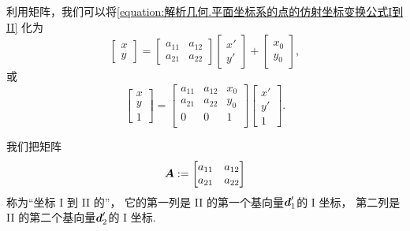 利用矩阵，我们可以将\cref{equation:解析几何.平面坐标系的点的仿射坐标变换公式I到II}
化为\begin{equation}\label{equation:解析几何.平面坐标系的点的仿射坐标变换公式I到II.矩阵形式1}
	\begin{bmatrix}
		x \\ y
	\end{bmatrix}
	= \begin{bmatrix}
		a_{11} & a_{12} \\
		a_{21} & a_{22}
	\end{bmatrix}
	\begin{bmatrix}
		x' \\ y'
	\end{bmatrix}
	+ \begin{bmatrix}
		x_0 \\ y_0
	\end{bmatrix},
\end{equation}
或\begin{equation}%
	\begin{bmatrix}
		x \\ y \\ 1
	\end{bmatrix}
	= \begin{bmatrix}
		a_{11} & a_{12} & x_0 \\
		a_{21} & a_{22} & y_0 \\
		0 & 0 & 1 \\
	\end{bmatrix}
	\begin{bmatrix}
		x' \\ y' \\ 1
	\end{bmatrix}.
\end{equation}

我们把矩阵\begin{equation*}
	\boldsymbol{A}
	:=
	\begin{bmatrix}
		a_{11} & a_{12} \\
		a_{21} & a_{22}
	\end{bmatrix}
\end{equation*}
称为“坐标 I 到 II 的”，
它的第一列是 II 的第一个基向量\(\boldsymbol{d}_1'\)的 I 坐标，
第二列是 II 的第二个基向量\(\boldsymbol{d}_2'\)的 I 坐标.

